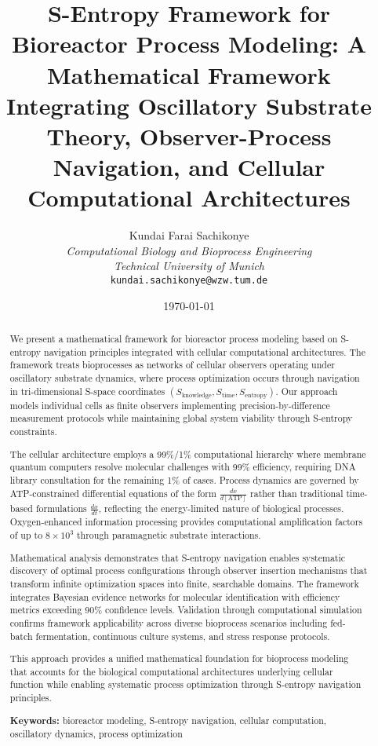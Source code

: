 \documentclass[12pt,a4paper]{article}
\title{\textbf{S-Entropy Framework for Bioreactor Process Modeling: A Mathematical Framework Integrating Oscillatory Substrate Theory, Observer-Process Navigation, and Cellular Computational Architectures}}
\author{
Kundai Farai Sachikonye\\
\textit{Computational Biology and Bioprocess Engineering}\\
\textit{Technical University of Munich}\\
\texttt{kundai.sachikonye@wzw.tum.de}
}
\date{\today}
\begin{document}
\maketitle

\begin{abstract}
We present a mathematical framework for bioreactor process modeling based on S-entropy navigation principles integrated with cellular computational architectures. The framework treats bioprocesses as networks of cellular observers operating under oscillatory substrate dynamics, where process optimization occurs through navigation in tri-dimensional S-space coordinates $(S_{\text{knowledge}}, S_{\text{time}}, S_{\text{entropy}})$. Our approach models individual cells as finite observers implementing precision-by-difference measurement protocols while maintaining global system viability through S-entropy constraints.

The cellular architecture employs a 99\%/1\% computational hierarchy where membrane quantum computers resolve molecular challenges with 99\% efficiency, requiring DNA library consultation for the remaining 1\% of cases. Process dynamics are governed by ATP-constrained differential equations of the form $\frac{dx}{d[\text{ATP}]}$ rather than traditional time-based formulations $\frac{dx}{dt}$, reflecting the energy-limited nature of biological processes. Oxygen-enhanced information processing provides computational amplification factors of up to $8 \times 10^3$ through paramagnetic substrate interactions.

Mathematical analysis demonstrates that S-entropy navigation enables systematic discovery of optimal process configurations through observer insertion mechanisms that transform infinite optimization spaces into finite, searchable domains. The framework integrates Bayesian evidence networks for molecular identification with efficiency metrics exceeding 90\% confidence levels. Validation through computational simulation confirms framework applicability across diverse bioprocess scenarios including fed-batch fermentation, continuous culture systems, and stress response protocols.

This approach provides a unified mathematical foundation for bioprocess modeling that accounts for the biological computational architectures underlying cellular function while enabling systematic process optimization through S-entropy navigation principles.

\textbf{Keywords:} bioreactor modeling, S-entropy navigation, cellular computation, oscillatory dynamics, process optimization
\end{abstract}
\end{document}
